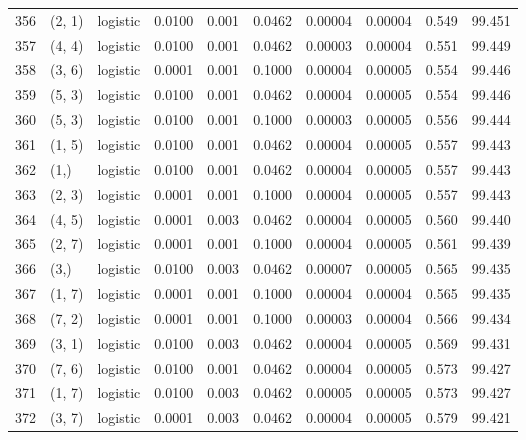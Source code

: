 \begin{tabular}{lllrrrrrrr}
356 &      (2, 1) &  logistic &  0.0100 &  0.001 &  0.0462 &          0.00004 &    0.00004 &       0.549 &    99.451 \\
357 &      (4, 4) &  logistic &  0.0100 &  0.001 &  0.0462 &          0.00003 &    0.00004 &       0.551 &    99.449 \\
358 &      (3, 6) &  logistic &  0.0001 &  0.001 &  0.1000 &          0.00004 &    0.00005 &       0.554 &    99.446 \\
359 &      (5, 3) &  logistic &  0.0100 &  0.001 &  0.0462 &          0.00004 &    0.00005 &       0.554 &    99.446 \\
360 &      (5, 3) &  logistic &  0.0100 &  0.001 &  0.1000 &          0.00003 &    0.00005 &       0.556 &    99.444 \\
361 &      (1, 5) &  logistic &  0.0100 &  0.001 &  0.0462 &          0.00004 &    0.00005 &       0.557 &    99.443 \\
362 &        (1,) &  logistic &  0.0100 &  0.001 &  0.0462 &          0.00004 &    0.00005 &       0.557 &    99.443 \\
363 &      (2, 3) &  logistic &  0.0001 &  0.001 &  0.1000 &          0.00004 &    0.00005 &       0.557 &    99.443 \\
364 &      (4, 5) &  logistic &  0.0001 &  0.003 &  0.0462 &          0.00004 &    0.00005 &       0.560 &    99.440 \\
365 &      (2, 7) &  logistic &  0.0001 &  0.001 &  0.1000 &          0.00004 &    0.00005 &       0.561 &    99.439 \\
366 &        (3,) &  logistic &  0.0100 &  0.003 &  0.0462 &          0.00007 &    0.00005 &       0.565 &    99.435 \\
367 &      (1, 7) &  logistic &  0.0001 &  0.001 &  0.1000 &          0.00004 &    0.00004 &       0.565 &    99.435 \\
368 &      (7, 2) &  logistic &  0.0001 &  0.001 &  0.1000 &          0.00003 &    0.00004 &       0.566 &    99.434 \\
369 &      (3, 1) &  logistic &  0.0100 &  0.003 &  0.0462 &          0.00004 &    0.00005 &       0.569 &    99.431 \\
370 &      (7, 6) &  logistic &  0.0100 &  0.001 &  0.0462 &          0.00004 &    0.00005 &       0.573 &    99.427 \\
371 &      (1, 7) &  logistic &  0.0100 &  0.003 &  0.0462 &          0.00005 &    0.00005 &       0.573 &    99.427 \\
372 &      (3, 7) &  logistic &  0.0001 &  0.003 &  0.0462 &          0.00004 &    0.00005 &       0.579 &    99.421 \\

\end{tabular}
